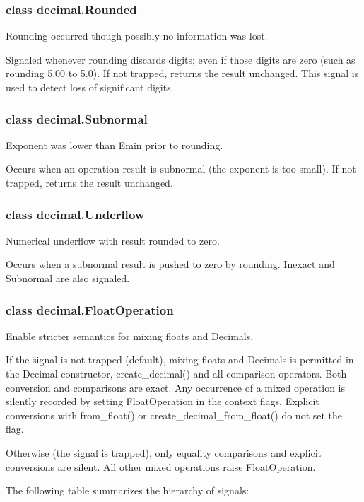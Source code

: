 \subsubsection{class decimal.Rounded}

Rounding occurred though possibly no information was lost.

Signaled whenever rounding discards digits; even if those digits are zero (such as rounding 5.00 to 5.0). If not trapped, returns the result unchanged. This signal is used to detect loss of significant digits.

\subsubsection{class decimal.Subnormal}

Exponent was lower than Emin prior to rounding.

Occurs when an operation result is subnormal (the exponent is too small). If not trapped, returns the result unchanged.

\subsubsection{class decimal.Underflow}

Numerical underflow with result rounded to zero.

Occurs when a subnormal result is pushed to zero by rounding. Inexact and Subnormal are also signaled.

\subsubsection{class decimal.FloatOperation}

Enable stricter semantics for mixing floats and Decimals.

\vpara
If the signal is not trapped (default), mixing floats and Decimals is permitted in the Decimal constructor, create\_decimal() and all comparison operators. Both conversion and comparisons are exact. Any occurrence of a mixed operation is silently recorded by setting FloatOperation in the context flags. Explicit conversions with from\_float() or create\_decimal\_from\_float() do not set the flag.

\vpara
Otherwise (the signal is trapped), only equality comparisons and explicit conversions are silent. All other mixed operations raise FloatOperation.

\vpara
The following table summarizes the hierarchy of signals:

